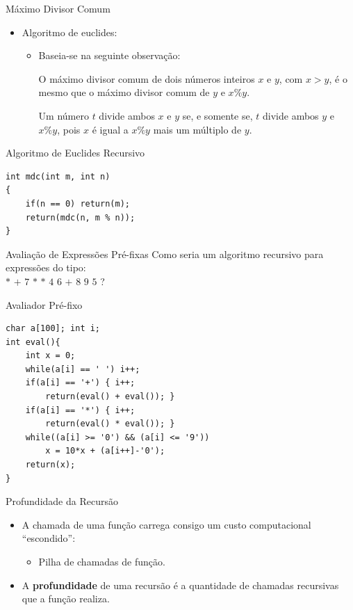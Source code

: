 \documentclass{beamer}
\begin{document}
	\begin{frame}[c]{Máximo Divisor Comum}
		\begin{itemize}
			\item Algoritmo de euclides:
			\begin{itemize}
				\item Baseia-se na seguinte observação:
				\begin{center}
					O máximo divisor comum de dois números inteiros $x$ e $y$, com $x > y$, é o mesmo que o máximo divisor comum de $y$ e $x \% y$.

					\vspace{10pt}
					\pause
					Um número $t$ divide ambos $x$ e $y$ se, e somente se, $t$ divide ambos $y$ e $x \% y$, pois $x$ é igual a $x \% y$ mais um múltiplo de $y$.
				\end{center}
			\end{itemize}
		\end{itemize}
	\end{frame}

	\begin{frame}[fragile,c]{Algoritmo de Euclides Recursivo}
		\begin{verbatim}
int mdc(int m, int n)
{
	if(n == 0) return(m);
	return(mdc(n, m % n));
}
		\end{verbatim}
	\end{frame}

	\begin{frame}[c]{Avaliação de Expressões Pré-fixas}
		Como seria um algoritmo recursivo para expressões do tipo:\\

		$*$ $+$ $7$ $*$ $*$ $4$ $6$ $+$ $8$ $9$ $5$ ?
	\end{frame}

	\begin{frame}[fragile,c]{Avaliador Pré-fixo}
		\begin{verbatim}
char a[100]; int i;
int eval(){
	int x = 0;
	while(a[i] == ' ') i++;
	if(a[i] == '+') { i++;
		return(eval() + eval()); }
	if(a[i] == '*') { i++;
		return(eval() * eval()); }
	while((a[i] >= '0') && (a[i] <= '9'))
		x = 10*x + (a[i++]-'0');
	return(x);
}
		\end{verbatim}
	\end{frame}

	\begin{frame}[c]{Profundidade da Recursão}
		\begin{itemize}
			\item A chamada de uma função carrega consigo um custo computacional ``escondido'':
			\begin{itemize}
				\item Pilha de chamadas de função.
			\end{itemize}
			\item A \textbf{profundidade} de uma recursão é a quantidade de chamadas recursivas que a função realiza.
		\end{itemize}
	\end{frame}
\end{document}
